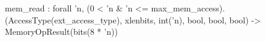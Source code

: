 mem_read : forall 'n, (0 < 'n & 'n <= max_mem_access).
  (AccessType(ext_access_type), xlenbits, int('n), bool, bool, bool) -> MemoryOpResult(bits(8 * 'n))